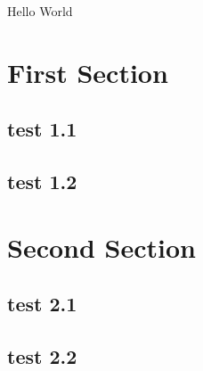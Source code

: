 \documentclass{article}
\begin{document}
Hello World

\section{First Section}

\subsection{test 1.1}


\subsection{test 1.2}

\section{Second Section}

\subsection{test 2.1}

\subsection{test 2.2}
\end{document}
